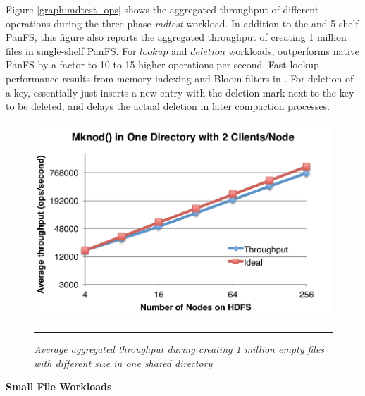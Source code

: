 Figure \ref{graph:mdtest_ops} shows the aggregated throughput of
different operations during the three-phase {\it mdtest} workload.
In addition to the \psys and 5-shelf PanFS, this figure also reports the 
aggregated throughput of creating 1 million files in single-shelf PanFS.
For $lookup$ and $deletion$ workloads, \psys outperforms native PanFS by a
factor to 10 to 15 higher operations per second.
Fast lookup performance results from memory indexing and Bloom filters in \ldb.
For deletion of a key, \ldb essentially just inserts a new entry with the 
deletion mark next to the key to be deleted, and delays the actual deletion in 
later compaction processes.


\begin{figure}[t]  %
\centerline{\includegraphics[scale=0.6]{./figs/hdfs_empty_file}}
\vspace{10pt}
\caption{
\textit{Average aggregated throughput during creating 1 million empty files
with different size in one shared directory}
}
\hrule
\label{graph:smallfiles}
\end{figure}       %


\textbf{Small File Workloads -- }

